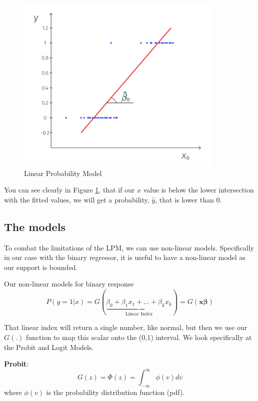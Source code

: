 \documentclass[11pt]{article}
\begin{document}
\begin{figure}[h]
    \centering
    \includegraphics[width=10cm]{photos/LPM.png}
    \caption{Linear Probability Model}
    \label{fig:LPM}
\end{figure}

You can see clearly in Figure \ref{fig:LPM}, that if our $x$ value is below the lower intersection with the fitted values, we will get a probability, $\hat{y}$, that is lower than 0.


\subsection{The models}

To combat the limitations of the LPM, we can use non-linear models. Specifically in our case with the binary regressor, it is useful to have a non-linear model as our support is bounded.

Our non-linear models for binary response
\[P(y=1|x) = G(\underbrace{\beta_0 + \beta_1 x_1+ \ldots + \beta_k x_k}_{\text{Linear Index}}) = G(\boldsymbol{x\beta})\]

That linear index will return a single number, like normal, but then we use our $G(.)$ function to map this scalar onto the (0,1) interval. We look specifically at the Probit and Logit Models.

\begin{definition}
    \textbf{Probit}:
    \begin{equation}
        \label{Probit}
        G(z) = \Phi (z) = \int_{-\infty}^\infty \phi (v) dv
    \end{equation}
    where $\phi(v)$ is the probability distribution function (pdf).
\end{definition}
\end{document}
